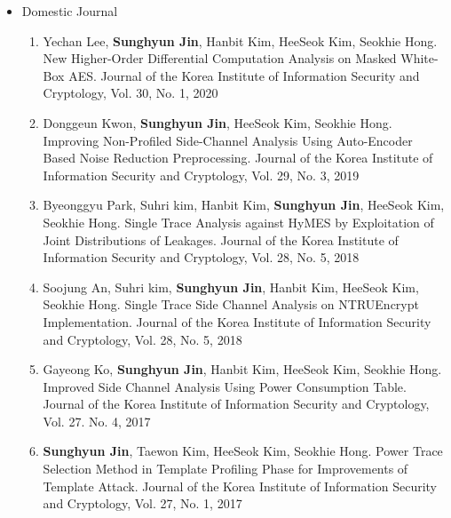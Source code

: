 \documentclass[a4paper,20pt]{article}
\begin{document}
\begin{itemize}
    \item {Domestic Journal}
        \vspace{-6pt}
        \begin{enumerate}
            \item {Yechan Lee, \textbf{Sunghyun Jin}, Hanbit Kim, HeeSeok Kim, Seokhie Hong. New Higher-Order Differential Computation Analysis on Masked White-Box AES. Journal of the Korea Institute of Information Security and Cryptology, Vol. 30, No. 1, 2020}
            \vspace{-2pt}
            \item {Donggeun Kwon, \textbf{Sunghyun Jin}, HeeSeok Kim, Seokhie Hong. Improving Non-Profiled Side-Channel Analysis Using Auto-Encoder Based Noise Reduction Preprocessing. Journal of the Korea Institute of Information Security and Cryptology, Vol. 29, No. 3, 2019}
            \vspace{-2pt}
            \item {Byeonggyu Park, Suhri kim, Hanbit Kim, \textbf{Sunghyun Jin}, HeeSeok Kim, Seokhie Hong. Single Trace Analysis against HyMES by Exploitation of Joint Distributions of Leakages. Journal of the Korea Institute of Information Security and Cryptology, Vol. 28, No. 5, 2018}
            \vspace{-2pt}
            \item {Soojung An, Suhri kim, \textbf{Sunghyun Jin}, Hanbit Kim, HeeSeok Kim, Seokhie Hong. Single Trace Side Channel Analysis on NTRUEncrypt Implementation. Journal of the Korea Institute of Information Security and Cryptology, Vol. 28, No. 5, 2018}
            \vspace{-2pt}
            \item {Gayeong Ko, \textbf{Sunghyun Jin}, Hanbit Kim, HeeSeok Kim, Seokhie Hong. Improved Side Channel Analysis Using Power Consumption Table. Journal of the Korea Institute of Information Security and Cryptology, Vol. 27. No. 4, 2017}
            \vspace{-2pt}
            \item {\textbf{Sunghyun Jin}, Taewon Kim, HeeSeok Kim, Seokhie Hong. Power Trace Selection Method in Template Profiling Phase for Improvements of Template Attack. Journal of the Korea Institute of Information Security and Cryptology, Vol. 27, No. 1, 2017}
            \vspace{-2pt}
        \end{enumerate}
        

\end{itemize}
\end{document}
